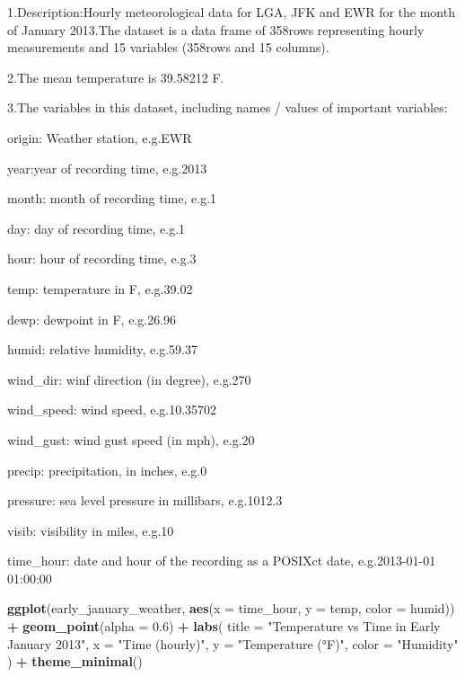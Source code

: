 \documentclass[
]{article}
\newenvironment{Shaded}{\begin{snugshade}}{\end{snugshade}}
\newcommand{\AttributeTok}[1]{\textcolor[rgb]{0.13,0.29,0.53}{#1}}
\newcommand{\FloatTok}[1]{\textcolor[rgb]{0.00,0.00,0.81}{#1}}
\newcommand{\FunctionTok}[1]{\textcolor[rgb]{0.13,0.29,0.53}{\textbf{#1}}}
\newcommand{\NormalTok}[1]{#1}
\newcommand{\SpecialCharTok}[1]{\textcolor[rgb]{0.81,0.36,0.00}{\textbf{#1}}}
\newcommand{\StringTok}[1]{\textcolor[rgb]{0.31,0.60,0.02}{#1}}
\begin{document}
1.Description:Hourly meteorological data for LGA, JFK and EWR for the
month of January 2013.The dataset is a data frame of 358rows
representing hourly measurements and 15 variables (358rows and 15
columns).

2.The mean temperature is 39.58212 F.

3.The variables in this dataset, including names / values of important
variables:

origin: Weather station, e.g.EWR

year:year of recording time, e.g.2013

month: month of recording time, e.g.1

day: day of recording time, e.g.1

hour: hour of recording time, e.g.3

temp: temperature in F, e.g.39.02

dewp: dewpoint in F, e.g.26.96

humid: relative humidity, e.g.59.37

wind\_dir: winf direction (in degree), e.g.270

wind\_speed: wind speed, e.g.10.35702

wind\_gust: wind gust speed (in mph), e.g.20

precip: precipitation, in inches, e.g.0

pressure: sea level pressure in millibars, e.g.1012.3

visib: visibility in miles, e.g.10

time\_hour: date and hour of the recording as a POSIXct date,
e.g.2013-01-01 01:00:00

\begin{Shaded}
\begin{Highlighting}[]
\FunctionTok{ggplot}\NormalTok{(early\_january\_weather, }\FunctionTok{aes}\NormalTok{(}\AttributeTok{x =}\NormalTok{ time\_hour, }\AttributeTok{y =}\NormalTok{ temp, }\AttributeTok{color =}\NormalTok{ humid)) }\SpecialCharTok{+}
  \FunctionTok{geom\_point}\NormalTok{(}\AttributeTok{alpha =} \FloatTok{0.6}\NormalTok{) }\SpecialCharTok{+}
  \FunctionTok{labs}\NormalTok{(}
    \AttributeTok{title =} \StringTok{"Temperature vs Time in Early January 2013"}\NormalTok{,}
    \AttributeTok{x =} \StringTok{"Time (hourly)"}\NormalTok{,}
    \AttributeTok{y =} \StringTok{"Temperature (°F)"}\NormalTok{,}
    \AttributeTok{color =} \StringTok{"Humidity"}
\NormalTok{  ) }\SpecialCharTok{+}
  \FunctionTok{theme\_minimal}\NormalTok{()}
\end{Highlighting}
\end{Shaded}
\end{document}
